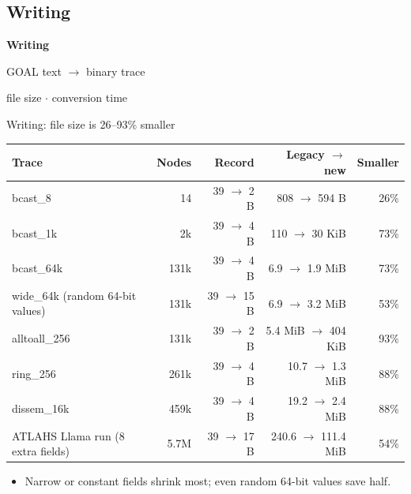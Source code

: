 \documentclass[aspectratio=169,11pt]{beamer}
\begin{document}
\subsection{Writing}

\begin{frame}
\centering\vfill
{\Huge\bfseries Writing\par}
\vspace{3mm}
{\large GOAL text $\to$ binary trace\par}
\vspace{3mm}
{\small\color{black!60}file size $\cdot$ conversion time\par}
\vfill
\end{frame}

\begin{frame}{Writing: file size is 26--93\% smaller}
\centering
\small
\begin{tabular}{lrrrr}
\toprule
\textbf{Trace} & \textbf{Nodes} & \textbf{Record} & \textbf{Legacy $\to$ new} & \textbf{Smaller} \\
\midrule
bcast\_8 & 14 & 39 $\to$ 2 B & 808 $\to$ 594 B & 26\% \\
bcast\_1k & 2k & 39 $\to$ 4 B & 110 $\to$ 30 KiB & 73\% \\
bcast\_64k & 131k & 39 $\to$ 4 B & 6.9 $\to$ 1.9 MiB & 73\% \\
wide\_64k (random 64-bit values) & 131k & 39 $\to$ 15 B & 6.9 $\to$ 3.2 MiB & 53\% \\
alltoall\_256 & 131k & 39 $\to$ 2 B & 5.4 MiB $\to$ 404 KiB & 93\% \\
ring\_256 & 261k & 39 $\to$ 4 B & 10.7 $\to$ 1.3 MiB & 88\% \\
dissem\_16k & 459k & 39 $\to$ 4 B & 19.2 $\to$ 2.4 MiB & 88\% \\
ATLAHS Llama run (8 extra fields) & 5.7M & 39 $\to$ 17 B & 240.6 $\to$ 111.4 MiB & 54\% \\
\bottomrule
\end{tabular}
\par\raggedright\vspace{3mm}
\begin{itemize}
\item Narrow or constant fields shrink most; even random 64-bit values save half.
\end{itemize}
\end{frame}
\end{document}
